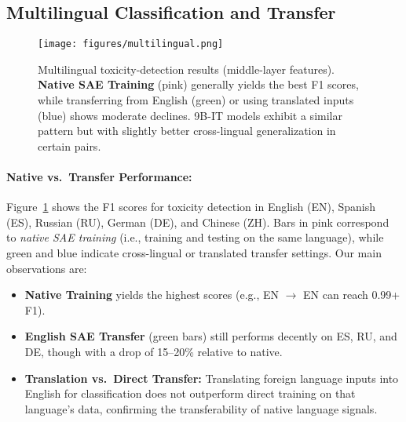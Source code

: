 
\subsection{Multilingual Classification and Transfer}
\label{sec:multilingual_results}

\begin{figure}[t]
    \centering
    \texttt{[image: figures/multilingual.png]}
    \caption{Multilingual toxicity-detection results (middle-layer features). \textbf{Native SAE Training} (pink) generally yields the best F1 scores, while transferring from English (green) or using translated inputs (blue) shows moderate declines. 9B-IT models exhibit a similar pattern but with slightly better cross-lingual generalization in certain pairs.}
    \label{fig:multilingual}
\end{figure}

\paragraph{Native vs.\ Transfer Performance:}
Figure~\ref{fig:multilingual} shows the F1 scores for toxicity detection in English (EN), Spanish (ES), Russian (RU), German (DE), and Chinese (ZH). Bars in pink correspond to \emph{native SAE training} (i.e., training and testing on the same language), while green and blue indicate cross-lingual or translated transfer settings.
Our main observations are:
\begin{itemize}
    \item \textbf{Native Training} yields the highest scores (e.g., EN $\to$ EN can reach 0.99+ F1). 
    \item \textbf{English SAE Transfer} (green bars) still performs decently on ES, RU, and DE, though with a drop of 15--20\% relative to native.
    \item \textbf{Translation vs.\ Direct Transfer:} Translating foreign language inputs into English for classification does not outperform direct training on that language’s data, confirming the transferability of native language signals.
\end{itemize}

